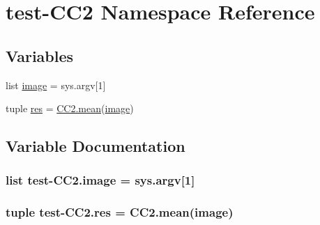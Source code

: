 \hypertarget{namespacetest-CC2}{\section{test-\/\-C\-C2 Namespace Reference}
\label{namespacetest-CC2}
}
\subsection*{Variables}
\begin{DoxyCompactItemize}
\item 
list \hyperlink{namespacetest-CC2_a6dd071a29131dcbd6ebf88f5ca28cedf}{image} = sys.\-argv\mbox{[}1\mbox{]}
\item 
tuple \hyperlink{namespacetest-CC2_ab40323d3e60749e1638b27277dc7f80e}{res} = \hyperlink{namespaceCC2_a8853f025a8480150d1fea2e730384a39}{C\-C2.\-mean}(\hyperlink{namespacetest-CC2_a6dd071a29131dcbd6ebf88f5ca28cedf}{image})
\end{DoxyCompactItemize}


\subsection{Variable Documentation}
\hypertarget{namespacetest-CC2_a6dd071a29131dcbd6ebf88f5ca28cedf}{
\subsubsection[{image}]{\setlength{\rightskip}{0pt plus 5cm}list test-\/C\-C2.\-image = sys.\-argv\mbox{[}1\mbox{]}}}\label{namespacetest-CC2_a6dd071a29131dcbd6ebf88f5ca28cedf}
\hypertarget{namespacetest-CC2_ab40323d3e60749e1638b27277dc7f80e}{
\subsubsection[{res}]{\setlength{\rightskip}{0pt plus 5cm}tuple test-\/C\-C2.\-res = {\bf C\-C2.\-mean}({\bf image})}}\label{namespacetest-CC2_ab40323d3e60749e1638b27277dc7f80e}

